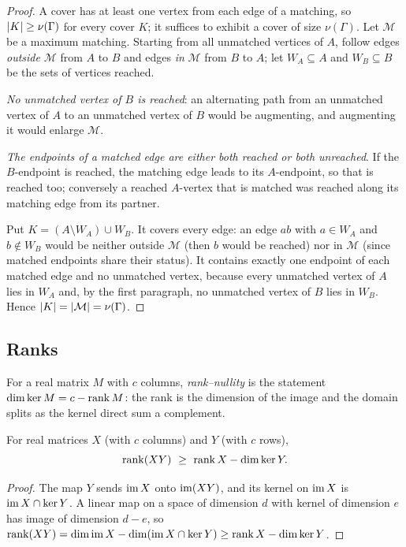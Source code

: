 \begin{proof}
A cover has at least one vertex from each edge of a matching, so $\lvert K\rvert\ge\nu(\Gamma)$ for every
cover $K$; it suffices to exhibit a cover of size $\nu(\Gamma)$. Let $\mathcal M$ be a maximum
matching. Starting from all unmatched vertices of $A$, follow edges \emph{outside} $\mathcal M$ from
$A$ to $B$ and edges \emph{in} $\mathcal M$ from $B$ to $A$; let $W_A\subseteq A$ and $W_B\subseteq B$
be the sets of vertices reached.

\emph{No unmatched vertex of $B$ is reached}: an alternating path from an unmatched vertex of $A$ to
an unmatched vertex of $B$ would be augmenting, and augmenting it would enlarge $\mathcal M$.

\emph{The endpoints of a matched edge are either both reached or both unreached}. If the $B$-endpoint
is reached, the matching edge leads to its $A$-endpoint, so that is reached too; conversely a reached
$A$-vertex that is matched was reached along its matching edge from its partner.

Put $K=(A\setminus W_A)\cup W_B$. It covers every edge: an edge $ab$ with $a\in W_A$ and
$b\notin W_B$ would be neither outside $\mathcal M$ (then $b$ would be reached) nor in $\mathcal M$
(since matched endpoints share their status). It contains exactly one endpoint of each matched edge
and no unmatched vertex, because every unmatched vertex of $A$ lies in $W_A$ and, by the first
paragraph, no unmatched vertex of $B$ lies in $W_B$. Hence
$\lvert K\rvert=\lvert \mathcal M\rvert=\nu(\Gamma)$.
\end{proof}

\subsection{Ranks}\label{app:ranks}

For a real matrix $M$ with $c$ columns, \emph{rank--nullity} is the statement
$\dim\ker M=c-\operatorname{rank} M$: the rank is the dimension of the image and the domain splits as the kernel
direct sum a complement.

\begin{lemma}\label{lem:sylvester}
For real matrices $X$ (with $c$ columns) and $Y$ (with $c$ rows),
\[
 \operatorname{rank}(XY)\ \ge\ \operatorname{rank} X-\dim\ker Y .
\]
\end{lemma}

\begin{proof}
The map $Y$ sends $\operatorname{im} X$ onto $\operatorname{im}(XY)$, and its kernel on $\operatorname{im} X$ is $\operatorname{im} X\cap\ker Y$. A linear
map on a space of dimension $d$ with kernel of dimension $e$ has image of dimension $d-e$, so
$\operatorname{rank}(XY)=\dim\operatorname{im} X-\dim(\operatorname{im} X\cap\ker Y)\ge\operatorname{rank} X-\dim\ker Y$.
\end{proof}

